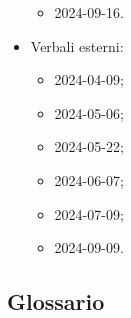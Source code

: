 \begin{itemize}
\begin{itemize}
    \item 2024-09-16.
  \end{itemize}
  \item Verbali esterni:
  \begin{itemize}
    \item 2024-04-09;
    \item 2024-05-06;
    \item 2024-05-22;
    \item 2024-06-07;
    \item 2024-07-09;
    \item 2024-09-09.
  \end{itemize}
\end{itemize}

\subsection{Glossario} 
\GlossarioIntroduzione

